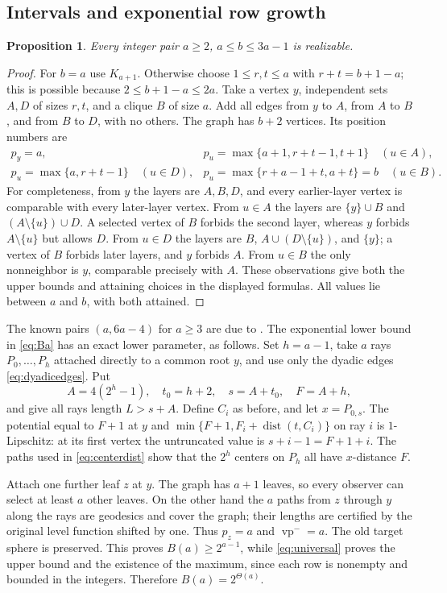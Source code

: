 \documentclass[11pt]{article}
\newtheorem{proposition}[theorem]{Proposition}
\theoremstyle{remark}\newtheorem{remark}[theorem]{Remark}
\newcommand{\vpm}{\operatorname{vp}^{-}}
\newcommand{\dist}{\operatorname{dist}}
\begin{document}
\subsection{Intervals and exponential row growth}
\begin{proposition}\label{prop:interval}
Every integer pair $a\ge2$, $a\le b\le3a-1$ is realizable.
\end{proposition}
\begin{proof}
For $b=a$ use $K_{a+1}$. Otherwise choose $1\le r,t\le a$ with
$r+t=b+1-a$; this is possible because $2\le b+1-a\le2a$.
Take a vertex $y$, independent sets $A,D$ of sizes $r,t$, and a clique $B$
of size $a$. Add all edges from $y$ to $A$, from $A$ to $B$, and from $B$
to $D$, with no others. The graph has $b+2$ vertices. Its position numbers are
\[
\begin{array}{ll}
 p_y=a,&p_u=\max\{a+1,r+t-1,t+1\}\quad(u\in A),\\
 p_u=\max\{a,r+t-1\}\quad(u\in D),&p_u=\max\{r+a-1+t,a+t\}=b\quad(u\in B).
\end{array}
\]
For completeness, from $y$ the layers are $A,B,D$, and every earlier-layer
vertex is comparable with every later-layer vertex. From $u\in A$ the layers
are $\{y\}\cup B$ and $(A\setminus\{u\})\cup D$. A selected vertex of $B$
forbids the second layer, whereas $y$ forbids $A\setminus\{u\}$ but allows
$D$. From $u\in D$ the layers are $B$, $A\cup(D\setminus\{u\})$, and $\{y\}$;
a vertex of $B$ forbids later layers, and $y$ forbids $A$. From $u\in B$
the only nonneighbor is $y$, comparable precisely with $A$. These observations
give both the upper bounds and attaining choices in the displayed formulas.
All values lie between $a$ and $b$, with both attained.
\end{proof}

The known pairs $(a,6a-4)$ for $a\ge3$ are due to
\cite[Lemma 2.3]{position}. The exponential lower bound in
\eqref{eq:Ba} has an exact lower parameter, as follows. Set $h=a-1$, take
$a$ rays $P_0,\ldots,P_h$ attached directly to a common root $y$, and use
only the dyadic edges \eqref{eq:dyadicedges}. Put
\[
 A=4(2^h-1),\quad t_0=h+2,\quad s=A+t_0,\quad F=A+h,
\]
and give all rays length $L>s+A$. Define $C_i$ as before, and let
$x=P_{0,s}$. The potential equal to $F+1$ at $y$ and
$\min\{F+1,F_i+\dist(t,C_i)\}$ on ray $i$ is $1$-Lipschitz:
at its first vertex the untruncated value is $s+i-1=F+1+i$.
The paths used in \eqref{eq:centerdist} show that the $2^h$ centers on $P_h$
all have $x$-distance $F$.

Attach one further leaf $z$ at $y$. The graph has $a+1$ leaves, so every
observer can select at least $a$ other leaves. On the other hand the $a$
paths from $z$ through $y$ along the rays are geodesics and cover the graph;
their lengths are certified by the original level function shifted by one.
Thus $p_z=a$ and $\vpm=a$. The old target sphere is preserved. This proves
$B(a)\ge2^{a-1}$, while \eqref{eq:universal} proves the upper bound and the
existence of the maximum, since each row is nonempty and bounded in the
integers. Therefore $B(a)=2^{\Theta(a)}$.
\end{document}

